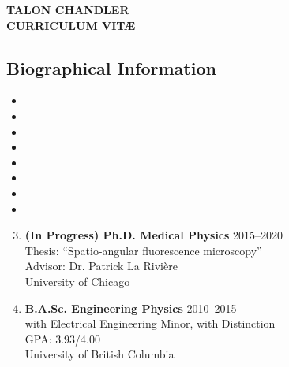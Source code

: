 \documentclass[12pt,letterpaper]{article}
\newenvironment{benumerate}[1]{
    \let\oldItem\item
    \def\item{\addtocounter{enumi}{-2}\oldItem}
    \begin{enumerate}[labelsep=0.0125\textwidth, align=left]
    \setcounter{enumi}{#1}
    \addtocounter{enumi}{1}
}{
    \end{enumerate}
  }
\begin{document}
\begin{center}
{\Large \textbf{TALON CHANDLER}}\\
{\textbf{CURRICULUM VIT\AE}}\\
\end{center}
\vspace{-1em}

\subsection*{Biographical Information}
\begin{itemize}[noitemsep]
\item[]  
\item[]  
\item[]  
\item[] \itab{} 
\item[] \itab{} 
\item[]  
\item[]  
\item[]  
\end{itemize}

\begin{benumerate}{2}
\item
  \textbf{(In Progress) Ph.D. Medical Physics} \hfill 2015--2020\\
  Thesis: ``Spatio-angular fluorescence microscopy''\\
  Advisor: Dr. Patrick La Rivi\`ere \\
  University of Chicago
\item
  \textbf{B.A.Sc. Engineering Physics} \hfill 2010--2015\\
  with Electrical Engineering Minor, with Distinction\\
  GPA: 3.93/4.00\\
  University of British Columbia
\end{benumerate}

\nocite{*}
\setlength{}
\printbibliography[heading=none, type=article, sorting=ynt, resetnumbers=true]
\end{document}
